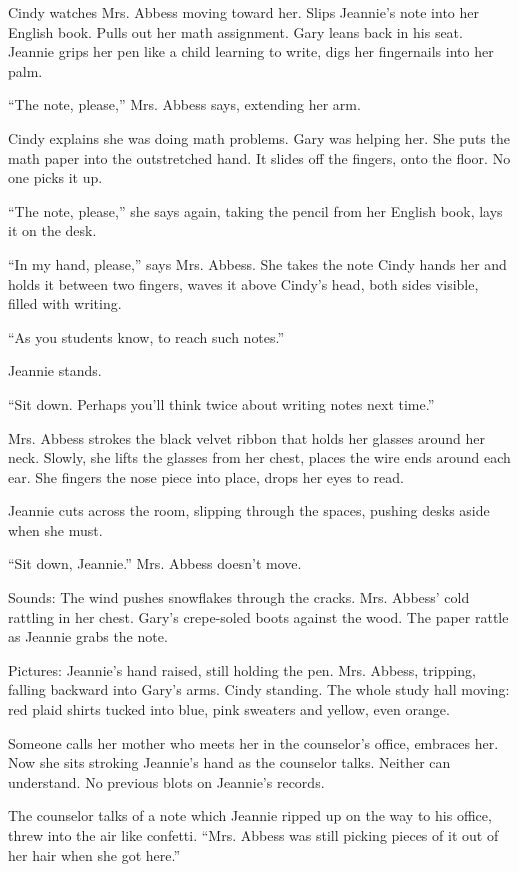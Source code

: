 \documentclass[
]{article}
\begin{document}
Cindy watches Mrs. Abbess moving toward her. Slips Jeannie's note into
her English book. Pulls out her math assignment. Gary leans back in his
seat. Jeannie grips her pen like a child learning to write, digs her
fingernails into her palm.

``The note, please,'' Mrs. Abbess says, extending her arm.

Cindy explains she was doing math problems. Gary was helping her. She
puts the math paper into the outstretched hand. It slides off the
fingers, onto the floor. No one picks it up.

``The note, please,'' she says again, taking the pencil from her English
book, lays it on the desk.

``In my hand, please,'' says Mrs. Abbess. She takes the note Cindy hands
her and holds it between two fingers, waves it above Cindy's head, both
sides visible, filled with writing.

``As you students know, to reach such notes.''

Jeannie stands.

``Sit down. Perhaps you'll think twice about writing notes next time.''

Mrs. Abbess strokes the black velvet ribbon that holds her glasses
around her neck. Slowly, she lifts the glasses from her chest, places
the wire ends around each ear. She fingers the nose piece into place,
drops her eyes to read.

Jeannie cuts across the room, slipping through the spaces, pushing desks
aside when she must.

``Sit down, Jeannie.'' Mrs. Abbess doesn't move.

Sounds: The wind pushes snowflakes through the cracks. Mrs. Abbess' cold
rattling in her chest. Gary's crepe-soled boots against the wood. The
paper rattle as Jeannie grabs the note.

Pictures: Jeannie's hand raised, still holding the pen. Mrs. Abbess,
tripping, falling backward into Gary's arms. Cindy standing. The whole
study hall moving: red plaid shirts tucked into blue, pink sweaters and
yellow, even orange.

Someone calls her mother who meets her in the counselor's office,
embraces her. Now she sits stroking Jeannie's hand as the counselor
talks. Neither can understand. No previous blots on Jeannie's records.

The counselor talks of a note which Jeannie ripped up on the way to his
office, threw into the air like confetti. ``Mrs. Abbess was still
picking pieces of it out of her hair when she got here.''
\end{document}
